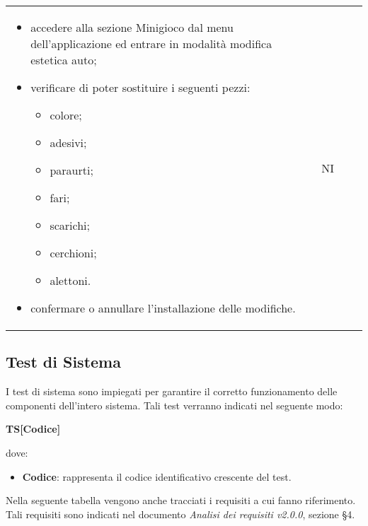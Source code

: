 \begin{longtable}{ >{\centering}p{} >{\centering}p{} >{\centering}p{}
			>{\centering}p{}}
		 \begin{itemize}
		 	\item accedere alla sezione Minigioco dal menu dell'applicazione ed entrare in modalità modifica estetica auto;
		 	\item verificare di poter sostituire i seguenti pezzi:
		 		\begin{itemize}
		 			\item colore;
		 			\item adesivi;
		 			\item paraurti;
		 			\item fari;
		 			\item scarichi;
		 			\item cerchioni;
		 			\item alettoni.
		 		\end{itemize}
		 	\item confermare o annullare l'installazione delle modifiche.
		 \end{itemize}	&	NI	\tabularnewline
\end{longtable}
\subsection{Test di Sistema}
I test di sistema sono impiegati per garantire il corretto funzionamento delle componenti dell'intero sistema. Tali test verranno indicati nel seguente modo:\\
	\centerline{\textbf{TS[Codice]}}
dove:
\begin{itemize}
	\item \textbf{Codice}: rappresenta il codice identificativo crescente del test.
\end{itemize}
	Nella seguente tabella vengono anche tracciati i requisiti a cui fanno riferimento. Tali requisiti sono indicati nel documento \textit{Analisi dei requisiti v2.0.0}, sezione §4.

	\renewcommand{\arraystretch}{1.5}
	
